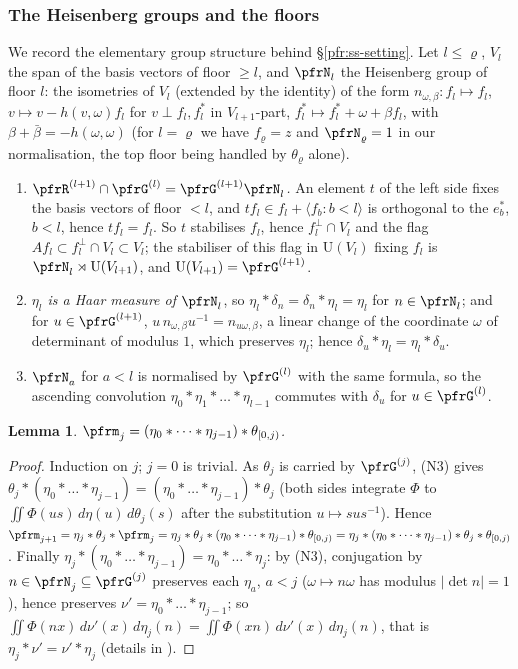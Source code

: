 \documentclass[10pt]{amsart}
\newtheorem{lemma}[theorem]{Lemma}
\theoremstyle{definition}
\theoremstyle{remark}
\providecommand{\auU}{\mathrm U}
\begin{document}
\subsubsection*{The Heisenberg groups and the floors}
We record the elementary group structure behind \S\ref{pfr:ss-setting}. Let $l\le\varrho$, $V_l$ the span of the
basis vectors of floor $\ge l$, and $\pfrN_l$ the Heisenberg group of floor $l$: the isometries of $V_l$
(extended by the identity) of the form $n_{\omega,\beta}\colon f_l\mapsto f_l$, $v\mapsto v-h(v,\omega)f_l$ for $v\perp
f_l,f_l^*$ in $V_{l+1}$-part, $f^*_l\mapsto f_l^*+\omega+\beta f_l$, with $\beta+\bar\beta=-h(\omega,\omega)$ (for $l=\varrho$
we have $f_\varrho=z$ and $\pfrN_\varrho=1$ in our normalisation, the top floor being handled by $\theta_\varrho$ alone).
\begin{enumerate}
\item[(N1)] \emph{$\pfrR^{(l+1)}\cap\pfrG^{(l)}=\pfrG^{(l+1)}\pfrN_l$.} An element $t$ of the left side fixes the basis
vectors of floor $<l$, and $tf_l\in f_l+\langle f_b:b<l\rangle$ is orthogonal to the $e_b^*$, $b<l$, hence $tf_l=f_l$.
So $t$ stabilises $f_l$, hence $f_l^\perp\cap V_l$ and the flag $Af_l\subset f_l^\perp\cap V_l\subset V_l$; the
stabiliser of this flag in $\auU(V_l)$ fixing $f_l$ is $\pfrN_l\rtimes\auU(V_{l+1})$, and $\auU(V_{l+1})=\pfrG^{(l+1)}$.
\item[(N2)] \emph{$\eta_l$ is a Haar measure of $\pfrN_l$}, so $\eta_l*\delta_n=\delta_n*\eta_l=\eta_l$ for $n\in\pfrN_l$;
and for $u\in\pfrG^{(l+1)}$, $u\,n_{\omega,\beta}u^{-1}=n_{u\omega,\beta}$, a linear change of the coordinate
$\omega$ of determinant of modulus $1$, which preserves $\eta_l$; hence $\delta_u*\eta_l=\eta_l*\delta_u$.
\item[(N3)] $\pfrN_a$ for $a<l$ is normalised by $\pfrG^{(l)}$ with the same formula, so the ascending convolution
$\eta_0*\eta_1*\dots*\eta_{l-1}$ commutes with $\delta_u$ for $u\in\pfrG^{(l)}$.
\end{enumerate}

\begin{lemma}\label{pfr:rearr}
$\pfrm_j=(\eta_0*\dots*\eta_{j-1})*\theta_{[0,j)}$.
\end{lemma}
\begin{proof}
Induction on $j$; $j=0$ is trivial. As $\theta_j$ is carried by $\pfrG^{(j)}$, (N3) gives $\theta_j*(\eta_0*\dots*\eta_{j-1})=
(\eta_0*\dots*\eta_{j-1})*\theta_j$ (both sides integrate $\Phi$ to $\iint\Phi(us)\,d\eta(u)\,d\theta_j(s)$ after
the substitution $u\mapsto sus^{-1}$). Hence $\pfrm_{j+1}=\eta_j*\theta_j*\pfrm_j=\eta_j*\theta_j*(\eta_0*\dots*\eta_{j-1})*
\theta_{[0,j)}=\eta_j*(\eta_0*\dots*\eta_{j-1})*\theta_j*\theta_{[0,j)}$. Finally $\eta_j*(\eta_0*\dots*\eta_{j-1})=
\eta_0*\dots*\eta_{j}$: by (N3), conjugation by $n\in\pfrN_j\subseteq\pfrG^{(j)}$ preserves each $\eta_a$, $a<j$
($\omega\mapsto n\omega$ has modulus $|\det n|=1$), hence preserves $\nu'=\eta_0*\dots*\eta_{j-1}$; so $\iint\Phi(nx)\,d\nu'(x)\,
d\eta_j(n)=\iint\Phi(xn)\,d\nu'(x)\,d\eta_j(n)$, that is $\eta_j*\nu'=\nu'*\eta_j$ (details in {\cite[\S3.1.6(i)]{P51}}).
\end{proof}
\end{document}
